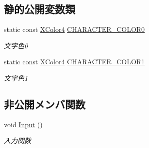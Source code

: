 \subsection*{静的公開変数類}
\begin{DoxyCompactItemize}
\item 
static const \mbox{\hyperlink{_vector3_d_8h_a680c30c4a07d86fe763c7e01169cd6cc}{X\+Color4}} \mbox{\hyperlink{class_pause_a628fcc4e89bb7af4de4cbd1d52928cb7}{C\+H\+A\+R\+A\+C\+T\+E\+R\+\_\+\+C\+O\+L\+O\+R0}}
\begin{DoxyCompactList}\small\item\em 文字色0 \end{DoxyCompactList}\item 
static const \mbox{\hyperlink{_vector3_d_8h_a680c30c4a07d86fe763c7e01169cd6cc}{X\+Color4}} \mbox{\hyperlink{class_pause_af494ffad9e8f1e048d775a1ee285b488}{C\+H\+A\+R\+A\+C\+T\+E\+R\+\_\+\+C\+O\+L\+O\+R1}}
\begin{DoxyCompactList}\small\item\em 文字色1 \end{DoxyCompactList}\end{DoxyCompactItemize}
\subsection*{非公開メンバ関数}
\begin{DoxyCompactItemize}
\item 
void \mbox{\hyperlink{class_pause_a7a5bc88c879edac4ae9144b7cb6b1d2f}{Input}} ()
\begin{DoxyCompactList}\small\item\em 入力関数 \end{DoxyCompactList}\end{DoxyCompactItemize}
